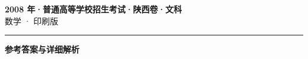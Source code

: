 \documentclass[zihao=5, a4paper]{ctexart}
\begin{document}
\begin{center}
  {\Large\bfseries 2008 年·普通高等学校招生考试·陕西卷·文科}\\[4pt]
  {\large 数学 · 印刷版}
\end{center}
\medskip
{}

\par\bigskip\hrule\bigskip
{}
\begin{center}{\large\bfseries 参考答案与详细解析}\end{center}
\smallskip

\end{document}
